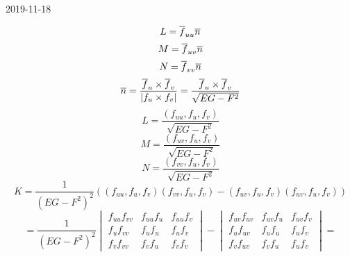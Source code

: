 \documentclass[main]{subfiles}
\begin{document}
\begin{lect}{2019-11-18}
    \begin{Proof}
      \[L = \overline{f}_{uu} \overline{n}\]
      \[M = \overline{f}_{uv} \overline{n}\]
      \[N = \overline{f}_{vv} \overline{n}\]
      \[\overline{n} = \frac{\overline{f}_u \times \overline{f}_v}{|f_u \times f_v|} = \frac{\overline{f}_u \times \overline{f}_v}{\sqrt{EG - F^2}}\]
      \[L = \frac{(f_{uu}, f_u, f_v)}{\sqrt{EG - F^2}}\]
      \[M = \frac{(f_{uv}, f_u, f_v)}{\sqrt{EG - F^2}}\]
      \[N = \frac{(f_{vv}, f_u, f_v)}{\sqrt{EG - F^2}}\]
      \[K = \frac{1}{(EG - F^2)^2} ( (f_{uu}, f_u, f_v)(f_{vv}, f_u, f_v) - (f_{uv}, f_u, f_v)(f_{uv}, f_u, f_v) )\]
      \[= \frac{1}{(EG - F^2)^2} \begin{vmatrix}
        f_{uu}f_{vv} & f_{uu}f_{u} & f_{uu}f_{v}\\
        f_{u}f_{vv} & f_{u}f_{u} & f_{u}f_{v}\\
        f_{v}f_{vv} & f_{v}f_{u} & f_{v}f_{v}
      \end{vmatrix} - \begin{vmatrix}
        f_{uv}f_{uv} & f_{uv}f_{u} & f_{uv}f_{v}\\
        f_{u}f_{uv} & f_{u}f_{u} & f_{u}f_{v}\\
        f_{v}f_{uv} & f_{v}f_{u} & f_{u}f_{v}
      \end{vmatrix} =\]


\end{Proof}
\end{lect}
\end{document}
